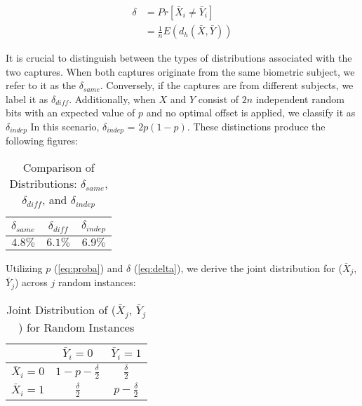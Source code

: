 \begin{equation} \label{eq:delta}
    \begin{aligned}
        \delta &= Pr[\bar{X}_i \neq \bar{Y}_i]\\
        &= \frac{1}{n}E(d_h(\bar{X}, \bar{Y}))
    \end{aligned}
\end{equation}

It is crucial to distinguish between the types of distributions associated with the two captures. When both captures originate from the same biometric subject, we refer to it as the $\delta_{same}$. Conversely, if the captures are from different subjects, we label it as $\delta_{diff}$. Additionally, when \(X\) and \(Y\) consist of \(2n\) independent random bits with an expected value of \(p\) and no optimal offset is applied, we classify it as $\delta_{indep}$ In this scenario, \(\delta_{indep}\) = \(2p(1-p)\). These distinctions produce the following figures: 

\begin{table}[H]
    \centering
    \renewcommand{\arraystretch}{1.25}\begin{tabular}{|c|c|c|}
        \hline
        $\delta_{same}$ & $\delta_{diff}$ & $\delta_{indep}$\\
        \hline
        $4.8\%$ & $6.1\%$ & $6.9\%$\\
        \hline
    \end{tabular}
\caption{Comparison of Distributions: $\delta_{same}$, $\delta_{diff}$, and $\delta_{indep}$}
\end{table}

Utilizing $p$ (\ref{eq:proba}) and $\delta$ (\ref{eq:delta}), we derive the joint distribution for (\(\bar{X}_j\), \(\bar{Y}_j\)) across \(j\) random instances:

\begin{table}[H]
    \centering
    \renewcommand{\arraystretch}{1.5}
    \begin{tabular}{|c|c|c|}
        \hline
        & $\bar{Y}_i = 0$ & $\bar{Y}_i = 1$\\
        \hline
        $\bar{X}_i = 0$ & $1 - p - \frac{\delta}{2}$ & $\frac{\delta}{2}$\\
        \hline
        $\bar{X}_i = 1$ & $\frac{\delta}{2}$ & $p - \frac{\delta}{2}$\\
        \hline
    \end{tabular}
    \caption{Joint Distribution of ($\bar{X}_j$, $\bar{Y}_j$) for Random Instances}
\end{table}



